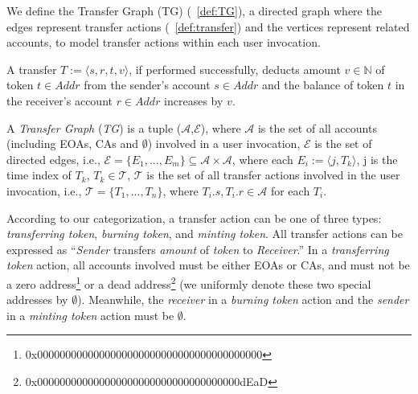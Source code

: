 We define the Transfer Graph (TG) (\mydef~\ref{def:TG}), a directed graph where the edges represent transfer actions (\mydef~\ref{def:transfer}) and the vertices represent related accounts, to model transfer actions within each user invocation.
\begin{definition}[Transfer]
\label{def:transfer}
    A transfer $T := \langle s, r, t, v \rangle$, if performed successfully, deducts amount $v \in \mathbb{N}$ of token $t \in Addr$ from the sender's account $s \in Addr$ and the balance of token $t$ in the receiver's account $r \in Addr$ increases by $v$.
\end{definition}
\begin{definition}
\label{def:TG}
    A \textit{Transfer Graph} (\textit{TG}) is a tuple ($\mathcal{A}$,$\mathcal{E}$), 
    where $\mathcal{A}$ is the set of all accounts (including EOAs, CAs and $\emptyset$) involved in a user invocation, 
    $\mathcal{E}$ is the set of directed edges, i.e., $\mathcal{E} = \{E_1,...,E_m\}\subseteq\mathcal{A}\times\mathcal{A}$, where each $E_i := \langle j, T_k \rangle$, j is the time index of $T_k$, $T_k \in \mathcal{T}$, 
    $\mathcal{T}$ is the set of all transfer actions involved in the user invocation, i.e., $\mathcal{T} = \{T_1,...,T_n\}$, where $T_i.s, T_i.r \in \mathcal{A}$ for each $T_i$.
\end{definition}
    

According to our categorization, a transfer action can be one of three types: \textit{transferring token}, \textit{burning token}, and \textit{minting token}.
All transfer actions can be expressed as ``\textit{Sender} transfers \textit{amount} of \textit{token} to \textit{Receiver}.''
In a \textit{transferring token} action, all accounts involved must be either EOAs or CAs, and must not be a zero address\footnote{0x0000000000000000000000000000000000000000} or a dead address\footnote{0x000000000000000000000000000000000000dEaD} (we uniformly denote these two special addresses by $\emptyset$).
Meanwhile, the \textit{receiver} in a \textit{burning token} action and the \textit{sender} in a \textit{minting token} action must be $\emptyset$.

